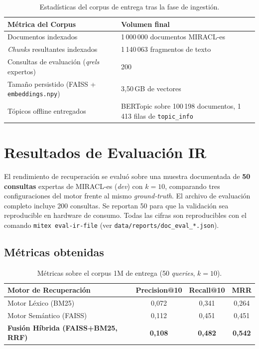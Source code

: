 \documentclass[11pt,a4paper]{article}
\newcommand{\code}[1]{\texttt{#1}}
\begin{document}
\begin{table}[htbp]
\centering
{}
\begin{tabularx}{\textwidth}{l X}
\toprule
\rowcolor{tabheader} \textbf{Métrica del Corpus} & \textbf{Volumen final} \\
\midrule
Documentos indexados & 1\,000\,000 documentos MIRACL-es \\
\textit{Chunks} resultantes indexados & 1\,140\,063 fragmentos de texto \\
Consultas de evaluación (\textit{qrels} expertos) & 200 \\
Tamaño persistido (FAISS + \code{embeddings.npy}) & 3,50\,GB de vectores \\
Tópicos offline entregados & BERTopic sobre 100\,198 documentos, 1\,413 filas de \code{topic\_info} \\
\bottomrule
\end{tabularx}
\caption{Estadísticas del corpus de entrega tras la fase de ingestión.}
\end{table}

\FloatBarrier

\section{Resultados de Evaluación IR}

El rendimiento de recuperación se evaluó sobre una muestra documentada de \textbf{50 consultas} expertas de MIRACL-es (\textit{dev}) con $k=10$, comparando tres configuraciones del motor frente al mismo \textit{ground-truth}. El archivo de evaluación completo incluye 200 consultas. Se reportan 50 para que la validación sea reproducible en hardware de consumo. Todas las cifras son reproducibles con el comando \code{mitex eval-ir-file} (ver \code{data/reports/doc\_eval\_*.json}).

\subsection{Métricas obtenidas}

\begin{table}[htbp]
\centering
{}
\begin{tabularx}{\textwidth}{X c c c}
\toprule
\rowcolor{tabheader} \textbf{Motor de Recuperación} & \textbf{Precision@10} & \textbf{Recall@10} & \textbf{MRR} \\
\midrule
Motor Léxico (BM25) & 0,072 & 0,341 & 0,264 \\
Motor Semántico (FAISS) & 0,112 & 0,451 & 0,451 \\
\rowcolor{green!8} \textbf{Fusión Híbrida (FAISS+BM25, RRF)} & \textbf{0,108} & \textbf{0,482} & \textbf{0,542} \\
\bottomrule
\end{tabularx}
\caption{Métricas sobre el corpus 1M de entrega (50 \textit{queries}, $k=10$).}
\end{table}
\end{document}

